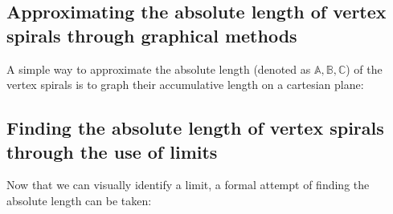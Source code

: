 \subsection{Approximating the absolute length of vertex spirals through graphical methods}
A simple way to approximate the absolute length (denoted as $\mathbb{A}, \mathbb{B}, \mathbb{C}$) of the vertex spirals is to graph their accumulative length on a cartesian plane:


\subsection{Finding the absolute length of vertex spirals through the use of limits}
Now that we can visually identify a limit, a formal attempt of finding the absolute length can be taken:
